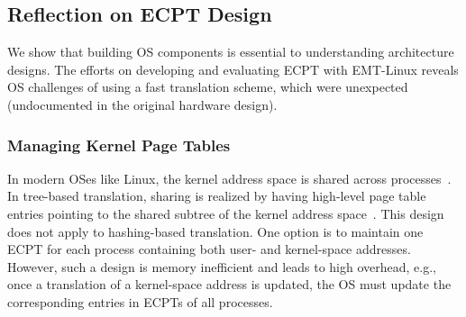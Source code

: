 \subsection{Reflection on ECPT Design}
\label{emt:sec:reflection}

\noindent
We show that building OS components is essential to 
	understanding architecture designs.
The efforts on developing and evaluating ECPT with EMT-Linux 
	reveals
	OS challenges of  
	using a fast translation scheme, 
	which were unexpected (undocumented in the original hardware design).

\subsubsection{Managing Kernel Page Tables}
\label{emt:ss:ecpt-kernelspace}
%

\noindent
In modern OSes like Linux, the kernel address space is shared across processes~\cite{linux:mm}.
In tree-based translation, sharing is realized by having high-level
	page table entries pointing to the shared subtree of the kernel address space~\cite{linux:kpti}.
This design does not apply to hashing-based translation.
One option is to maintain one ECPT for
	each process containing both user- and kernel-space addresses. %
However, such a design is memory inefficient and leads to high overhead, e.g.,
	once a translation of a kernel-space address is updated, the OS must 
	update the corresponding entries in ECPTs of all processes.

